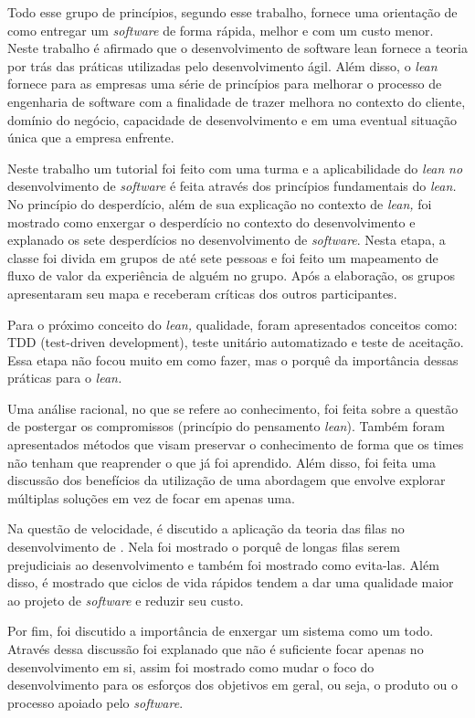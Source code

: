 Todo esse grupo de princípios, segundo esse trabalho, fornece uma orientação de como entregar um \textit{software} de forma rápida, melhor e com um custo menor. Neste trabalho é afirmado que o desenvolvimento de software lean fornece a teoria por trás das práticas utilizadas pelo desenvolvimento ágil. Além disso, o \textit{lean} fornece para as empresas uma série de princípios para melhorar o processo de engenharia de software com a finalidade de trazer melhora no contexto do cliente, domínio do negócio, capacidade de desenvolvimento e em uma eventual situação única que a empresa enfrente.

Neste trabalho um tutorial foi feito com uma turma e a aplicabilidade do \textit{lean}\textit{ no} desenvolvimento de \textit{software} é feita através dos princípios fundamentais do \textit{lean}\textit{.} No princípio do desperdício, além de sua explicação no contexto de \textit{lean}\textit{,} foi mostrado como enxergar o desperdício no contexto do desenvolvimento e explanado os sete desperdícios no desenvolvimento de \textit{software}. Nesta etapa, a classe foi divida em grupos de até sete pessoas e foi feito um mapeamento de fluxo de valor da experiência de alguém no grupo. Após a elaboração, os grupos apresentaram seu mapa e receberam críticas dos outros participantes.

Para o próximo conceito do \textit{lean}\textit{,} qualidade, foram apresentados conceitos como: TDD (test-driven development), teste unitário automatizado e teste de aceitação. Essa etapa não focou muito em como fazer, mas o porquê da importância dessas práticas para o \textit{lean}\textit{.}

Uma análise racional, no que se refere ao conhecimento, foi feita sobre a questão de postergar os compromissos (princípio do pensamento \textit{lean}). Também foram apresentados métodos que visam preservar o conhecimento de forma que os times não tenham que reaprender o que já foi aprendido. Além disso, foi feita uma discussão dos benefícios da utilização de uma abordagem que envolve explorar múltiplas soluções em vez de focar em apenas uma.

Na questão de velocidade, é discutido a aplicação da teoria das filas no desenvolvimento de \textit{\textit{}.} Nela foi mostrado o porquê de longas filas serem prejudiciais ao desenvolvimento e também foi mostrado como evita-las. Além disso, é mostrado que ciclos de vida rápidos tendem a dar uma qualidade maior ao projeto de \textit{software} e reduzir seu custo.

Por fim, foi discutido a importância de enxergar um sistema como um todo. Através dessa discussão foi explanado que não é suficiente focar apenas no desenvolvimento em si, assim foi mostrado como mudar o foco do desenvolvimento para os esforços dos  objetivos em geral, ou seja, o produto ou o processo apoiado pelo \textit{software}. 

